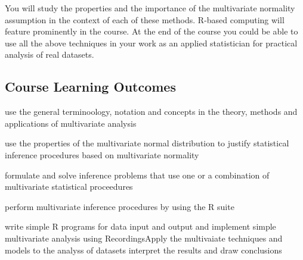 \documentclass[11pt]{article}
\begin{document}
You will study the properties and the importance of the multivariate normality
assumption in the context of each of these methods.
R-based computing will feature prominently in the course.
At the end of the course you could be able to use all the above techniques in
your work as an applied statistician for practical analysis of real datasets.

\subsection{Course Learning Outcomes}\label{subsec:course-learning-outcomes2}
\begin{description}
  \item use the general terminoology, notation and concepts in the theory, methods and applications of multivariate analysis
  \item use the properties of the multivariate normal distribution to justify statistical inference procedures based on multivariate normality
  \item formulate and solve inference problems that use one or a combination of multivariate statistical proceedures
  \item perform multivariate inference procedures by using the R suite
  \item write simple R programs for data input and output and implement simple multivariate analysis using RecordingsApply the multivaiate techniques and models to the analyss of datasets  interpret the results and draw conclusions
\end{description}
\end{document}
